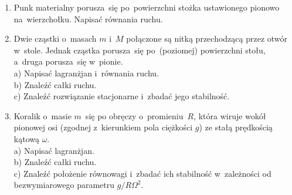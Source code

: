 \documentclass[a4paper,11pt]{article}
\begin{document}
\begin{enumerate}
\item Punk materialny porusza~się po~powierzchni stożka ustawionego pionowo
  na~wierzchołku. Napisać równania ruchu.



\item Dwie cząstki o~masach $m$ i~$M$ połączone są nitką przechodzącą
  przez otwór w~stole. Jednak cząstka porusza~się po~(poziomej) powierzchni
  stołu, a~druga porusza~się w~pionie. \\
  a) Napisać lagranżjan i~równania ruchu. \\
  b) Znaleźć całki ruchu. \\
  c) Znaleźć rozwiązanie stacjonarne i~zbadać jego stabilność.



\item Koralik o~masie $m$~się po obręczy o~promieniu~$R$, która wiruje wokół
  pionowej osi (zgodnej z~kierunkiem pola ciężkości $g$) ze stałą prędkością
  kątową $\omega$. \\
  a) Napisać lagranżjan. \\
  b) Znaleźć całki ruchu. \\
  c) Znaleźć położenie równowagi i~zbadać ich stabilność w~zależności od
  bezwymiarowego parametru $g / R \Omega^{ 2 }$.





















\end{enumerate}
\end{document}
